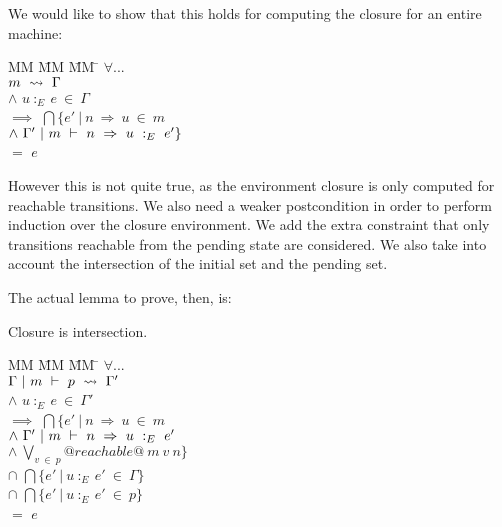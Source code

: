 We would like to show that this holds for computing the closure for an entire machine:

\begin{tabbing}
MM \= MM \= MM \= \kill
$\forall...$ \\
\> \> $m ~\rightsquigarrow~ \Gamma$ \\
\> $\wedge$ \> $u~:_E~e~\in~\Gamma$ \\
\> $\implies$\> $\bigcap \{e'~|~n~\Rightarrow~u~\in~m$ \\
\>           \>         \> $\wedge~\Gamma' ~|~ m ~\vdash~ n~\Rightarrow~u ~:_E~ e' \}$ \\
\> $=$       \> $e$
\end{tabbing}

However this is not quite true, as the environment closure is only computed for reachable transitions.
We also need a weaker postcondition in order to perform induction over the closure environment.
We add the extra constraint that only transitions reachable from the pending state are considered.
We also take into account the intersection of the initial set and the pending set.

The actual lemma to prove, then, is:

\begin{lemma}
Closure is intersection.

\begin{tabbing}
MM \= MM \= MM \= \kill
$\forall...$ \\
\>          \> $\Gamma ~|~ m ~\vdash~ p ~\rightsquigarrow~ \Gamma'$ \\
\> $\wedge$ \> $u~:_E~e~\in~\Gamma'$ \\
\> $\implies$\> $\bigcap\{e'~|~n~\Rightarrow~u~\in~m$ \\
\>           \>         \> $\wedge~\Gamma' ~|~ m ~\vdash~ n~\Rightarrow~u ~:_E~ e'$ \\
\>           \>         \> $\wedge~\bigvee_{v~\in~p}@reachable@~m~v~n\}$ \\
\> $\cap$ \> $\bigcap\{e' ~|~ u~:_E~e'~\in~\Gamma \} $ \\
\> $\cap$ \> $\bigcap\{e' ~|~ u~:_E~e'~\in~p \} $ \\
\> $=$       \> $e$
\end{tabbing}
\end{lemma}

